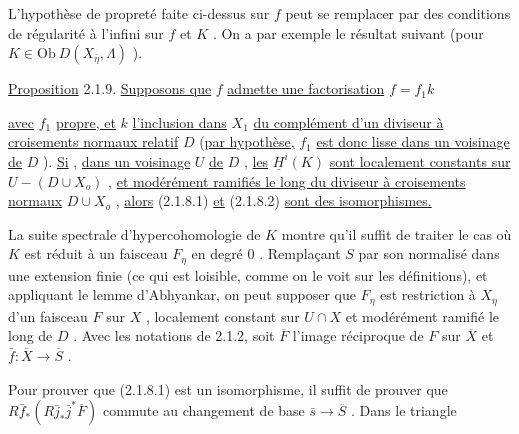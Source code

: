 L'hypothèse de propreté faite ci-dessus sur $f$ peut se remplacer par des conditions de régularité à l'infini sur $f$ et $K$ . On a par exemple le résultat suivant (pour $K \in \mathrm{Ob}\ D(X_{\bar\eta}, \Lambda)$ ).

\underline{Proposition} 2.1.9. \underline{Supposons que} $f$ \underline{admette une factorisation} $f = f_1k$

\begin{center}
\end{center}
\underline{avec} $f_1$ \underline{propre, et} $k$ \underline{l'inclusion dans} $X_1$ \underline{du complément d'un diviseur à croisements normaux relatif} $D$ (\underline{par hypothèse,} $f_1$ \underline{est donc lisse dans un voisinage de} $D$ ). \underline{Si} , \underline{dans un voisinage} $U$ \underline{de} $D$ , \underline{les} $\underline{H}^i(K)$ \underline{sont localement constants sur} $U-(D \cup X_o)$ , \underline{et modérément ramifiés le long du diviseur à croisements normaux} $D \cup X_o$ , \underline{alors} (2.1.8.1) \underline{et} (2.1.8.2) \underline{sont des isomorphismes.}

La suite spectrale d'hypercohomologie de $K$ montre qu'il suffit de traiter le cas où $K$ est réduit à un faisceau $F_\eta$ en degré $0$ . Remplaçant $S$ par son normalisé dans une extension finie (ce qui est loisible, comme on le voit sur les définitions), et appliquant le lemme d'Abhyankar, on peut supposer que $F_\eta$ est restriction à $X_\eta$ d'un faisceau $F$ sur $X$ , localement constant sur $U \cap X$ et modérément ramifié le long de $D$ . Avec les notations de 2.1.2, soit $\overline{F}$ l'image réciproque de $F$ sur $\overline{X}$ et $\bar f : \overline{X} \to \overline{S}$ .

Pour prouver que (2.1.8.1) est un isomorphisme, il suffit de prouver que $R\bar f_* (R\bar j_* \bar j^* \overline{F})$ commute au changement de base $\bar s \to \overline{S}$ . Dans le triangle


